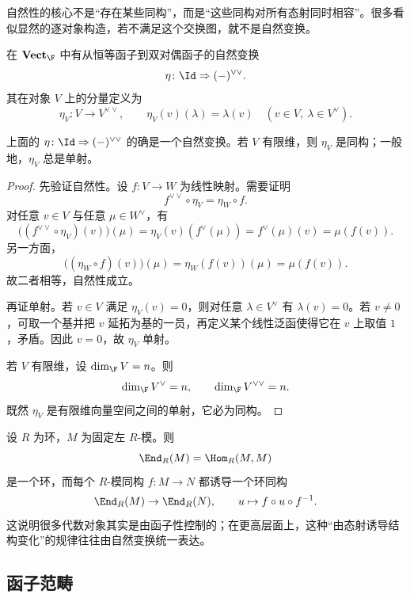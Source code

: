 \begin{remark}
自然性的核心不是“存在某些同构”，而是“这些同构对所有态射同时相容”。很多看似显然的逐对象构造，若不满足这个交换图，就不是自然变换。
\end{remark}

\begin{example}[双对偶自然变换]
在 $\mathbf{Vect}_{\F}$ 中有从恒等函子到双对偶函子的自然变换
\[
  \eta\colon \Id \Rightarrow (-)^{\vee\vee}.
\]
其在对象 $V$ 上的分量定义为
\[
  \eta_V\colon V\to V^{\vee\vee},
  \qquad
  \eta_V(v)(\lambda)=\lambda(v)
  \quad (v\in V,\ \lambda\in V^{\vee}).
\]
\end{example}

\begin{proposition}
上面的 $\eta\colon \Id \Rightarrow (-)^{\vee\vee}$ 的确是一个自然变换。若 $V$ 有限维，则 $\eta_V$ 是同构；一般地，$\eta_V$ 总是单射。
\end{proposition}

\begin{proof}
先验证自然性。设 $f\colon V\to W$ 为线性映射。需要证明
\[
  f^{\vee\vee}\circ \eta_V = \eta_W\circ f.
\]
对任意 $v\in V$ 与任意 $\mu\in W^{\vee}$，有
\[
  \bigl((f^{\vee\vee}\circ \eta_V)(v)\bigr)(\mu)
  = \eta_V(v)(f^{\vee}(\mu))
  = f^{\vee}(\mu)(v)
  = \mu(f(v)).
\]
另一方面，
\[
  \bigl((\eta_W\circ f)(v)\bigr)(\mu)
  = \eta_W(f(v))(\mu)
  = \mu(f(v)).
\]
故二者相等，自然性成立。

再证单射。若 $v\in V$ 满足 $\eta_V(v)=0$，则对任意 $\lambda\in V^{\vee}$ 有 $\lambda(v)=0$。若 $v\neq 0$，可取一个基并把 $v$ 延拓为基的一员，再定义某个线性泛函使得它在 $v$ 上取值 $1$，矛盾。因此 $v=0$，故 $\eta_V$ 单射。

若 $V$ 有限维，设 $\dim_{\F}V=n$。则
\[
  \dim_{\F}V^{\vee}=n,
  \qquad
  \dim_{\F}V^{\vee\vee}=n.
\]
既然 $\eta_V$ 是有限维向量空间之间的单射，它必为同构。
\end{proof}

\begin{example}
设 $R$ 为环，$M$ 为固定左 $R$-模。则
\[
  \End_R(M)=\Hom_R(M,M)
\]
是一个环，而每个 $R$-模同构 $f\colon M\to N$ 都诱导一个环同构
\[
  \End_R(M)\to \End_R(N),
  \qquad
  u\mapsto f\circ u\circ f^{-1}.
\]
这说明很多代数对象其实是由函子性控制的；在更高层面上，这种“由态射诱导结构变化”的规律往往由自然变换统一表达。
\end{example}

\subsection{函子范畴}

